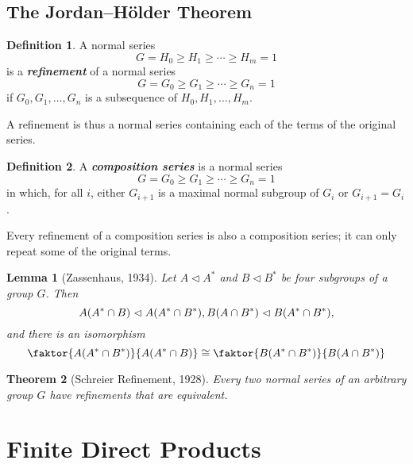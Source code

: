 \documentclass[12pt]{report}
\newtheorem{theorem}{Theorem}[chapter]
\newtheorem{lemma}[theorem]{Lemma}
\theoremstyle{definition}
\newtheorem*{definition}{Definition}
\newcommand{\term}[1]{\textbf{\textit{#1}}}
\begin{document}
\section{The Jordan–Hölder Theorem}

\begin{definition}
	A normal series
	\[ G = H_0 \geq H_1 \geq \cdots \geq H_m = 1 \]
	is a \term{refinement} of a normal series
	\[ G = G_0 \geq G_1 \geq \cdots \geq G_n = 1 \]
	if $G_0, G_1, \ldots, G_n$ is a subsequence of $H_0, H_1, \ldots, H_m$.\\
	\par
	A refinement is thus a normal series containing each of the terms of the original series.
\end{definition}

\begin{definition}
	A \term{composition series} is a normal series
	\[ G = G_0 \geq G_1 \geq \cdots \geq G_n = 1 \]
	in which, for all $i$, either $G_{i+1}$ is a maximal normal subgroup of $G_i$ or $G_{i+1}=G_i$.\\
	\par
	Every refinement of a composition series is also a composition series; it can only repeat some of the original terms.
\end{definition}

\setcounter{theorem}{9}

\begin{lemma}[Zassenhaus, 1934]
	Let $A\vartriangleleft A^*$ and $B\vartriangleleft B^*$ be four subgroups of a group $G$. Then
	\[
		A(A^*\cap B) \vartriangleleft A(A^*\cap B^*),\\
		B(A\cap B^*) \vartriangleleft B(A^*\cap B^*),
	\]
	and there is an isomorphism
	\[
		\faktor{A(A^*\cap B^*)}{A(A^*\cap B)}\cong\faktor{B(A^*\cap B^*)}{B(A\cap B^*)}
	\]
\end{lemma}

\begin{theorem}[Schreier Refinement, 1928]
	Every two normal series of an arbitrary group $G$ have refinements that are equivalent.
\end{theorem}


\chapter{Finite Direct Products}
\end{document}
